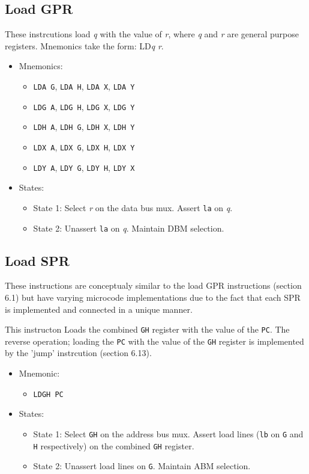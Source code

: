 \documentclass[a4paper,12pt]{article}
\newcommand{\Gr}{\texttt{G}}
\newcommand{\Hr}{\texttt{H}}
\newcommand{\PC}{\texttt{PC}}
\newcommand{\qq}{\textit{q}}
\newcommand\rr{\textit{r}}
\begin{document}
\subsection{Load GPR}
These instrcutions load \qq{} with the value of \rr{}, where \qq{} and \rr{}
are general purpose registers. Mnemonics take the form: LD\qq{} \rr{}.
\par

\begin{itemize}
\item Mnemonics:
\begin{itemize}
	\item \texttt{LDA G}, \texttt{LDA H}, \texttt{LDA X}, \texttt{LDA Y}
	\item \texttt{LDG A}, \texttt{LDG H}, \texttt{LDG X}, \texttt{LDG Y}
	\item \texttt{LDH A}, \texttt{LDH G}, \texttt{LDH X}, \texttt{LDH Y}
	\item \texttt{LDX A}, \texttt{LDX G}, \texttt{LDX H}, \texttt{LDX Y}
	\item \texttt{LDY A}, \texttt{LDY G}, \texttt{LDY H}, \texttt{LDY X}
\end{itemize}
\item States:
\begin{itemize}
	\item State 1: Select \rr{} on the data bus mux. Assert \texttt{la} on
	\qq{}.
	\item State 2: Unassert \texttt{la} on \qq{}. Maintain DBM selection.
\end{itemize}
\end{itemize}

\subsection{Load SPR}
These instructions are conceptualy similar to the load GPR instructions
(section 6.1) but have varying microcode implementations due to the fact that
each SPR is implemented and connected in a unique manner.
\par

This instructon Loads the combined \Gr{}\Hr{} register with the value of the 
\PC{}. The reverse operation; loading the \PC{} with the value of the 
\Gr{}\Hr{} register is implemented by the 'jump' instrcution (section 6.13).
\par

\begin{itemize}
\item Mnemonic:
\begin{itemize}
	\item \texttt{LDGH PC}
\end{itemize}
\item States:
\begin{itemize}
	\item State 1: Select \Gr{}\Hr{} on the address bus mux. Assert load
	lines (\texttt{lb} on \Gr{} and \Hr{} respectively) on the combined 
	\Gr{}\Hr{} register.
	\item State 2: Unassert load lines on \Gr{}. Maintain ABM selection.
\end{itemize}
\end{itemize}
\end{document}
